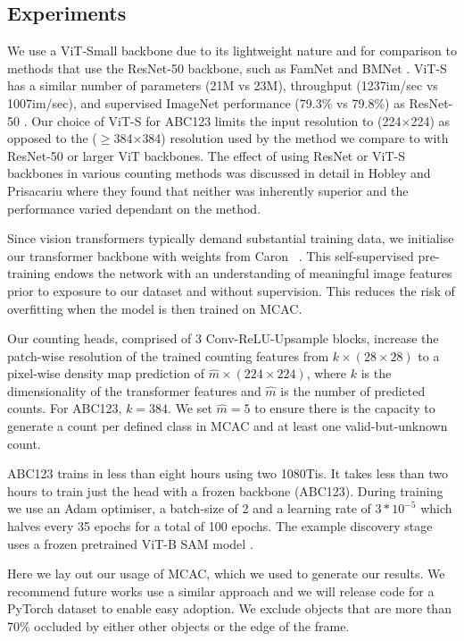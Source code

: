 \documentclass[runningheads]{llncs}
\begin{document}
\subsection{Experiments}
We use a ViT-Small \cite{dosovitskiy2020vit} backbone due to its lightweight nature and for comparison to methods that use the ResNet-50 backbone, such as FamNet and BMNet \cite{ranjan2021Famnet, shi2022represent}.
ViT-S has a similar number of parameters (21M vs 23M), throughput (1237im/sec vs 1007im/sec), and supervised ImageNet performance (79.3\% vs 79.8\%) as ResNet-50 \cite{touvron2021training}.
Our choice of ViT-S for ABC123 limits the input resolution to (224$\times$224) as opposed to the ($\geq$384$\times$384) resolution used by the method we compare to with ResNet-50 or larger ViT backbones.
The effect of using ResNet or ViT-S backbones in various counting methods was discussed in detail in Hobley and Prisacariu \cite{hobley2023LTCA} where they found that neither was inherently superior and the performance varied dependant on the method.

Since vision transformers typically demand substantial training data, we initialise our transformer backbone with weights from Caron \etal~\cite{caron2021DINO}.
This self-supervised pre-training endows the network with an understanding of meaningful image features prior to exposure to our dataset and without supervision. This reduces the risk of overfitting when the model is then trained on MCAC.

Our counting heads, comprised of 3 Conv-ReLU-Upsample blocks, increase the patch-wise resolution of the trained counting features from $k \times (28\times28)$ to a pixel-wise density map prediction of $\hat{m} \times (224\times224)$,
where $k$ is the dimensionality of the transformer features and $\hat{m}$ is the number of predicted counts. For ABC123, $k = 384$.
We set $\hat{m} = 5$ to ensure there is the capacity to generate a count per defined class in MCAC and at least one valid-but-unknown count. 

ABC123 trains in less than eight hours using two 1080Tis. It takes less than two hours to train just the head with a frozen backbone (ABC123\textsmaller[2]{\SnowflakeChevron}).
During training we use an Adam optimiser, a batch-size of 2 and a learning rate of $3*10^{-5}$ which halves every 35 epochs for a total of 100 epochs.
The example discovery stage uses a frozen pretrained ViT-B SAM model \cite{kirillov2023segany}. 

Here we lay out our usage of MCAC, which we used to generate our results. We recommend future works use a similar approach and we will release code for a PyTorch dataset to enable easy adoption.
We exclude objects that are more than 70\% occluded by either other objects or the edge of the frame. 
\end{document}
